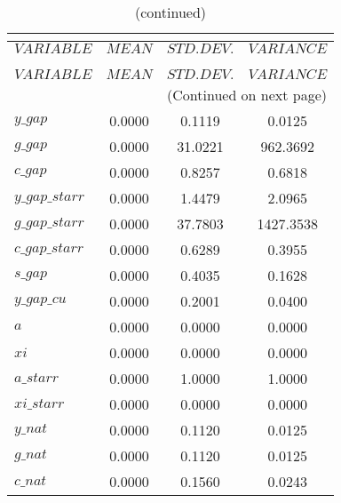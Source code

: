  
\begin{center}
\begin{longtable}{lccc} 
\caption{THEORETICAL MOMENTS}\\
 \label{Table:th_moments}\\
\toprule 
$VARIABLE       $	 & 	 $         MEAN$	 & 	 $    STD. DEV.$	 & 	 $     VARIANCE$\\
\midrule \endfirsthead 
\caption{(continued)}\\
 \toprule \\ 
$VARIABLE       $	 & 	 $         MEAN$	 & 	 $    STD. DEV.$	 & 	 $     VARIANCE$\\
\midrule \endhead 
\midrule \multicolumn{4}{r}{(Continued on next page)} \\ \bottomrule \endfoot 
\bottomrule \endlastfoot 
$y\_gap         $	 & 	       0.0000	 & 	       0.1119	 & 	       0.0125 \\ 
$g\_gap         $	 & 	       0.0000	 & 	      31.0221	 & 	     962.3692 \\ 
$c\_gap         $	 & 	       0.0000	 & 	       0.8257	 & 	       0.6818 \\ 
$y\_gap\_starr  $	 & 	       0.0000	 & 	       1.4479	 & 	       2.0965 \\ 
$g\_gap\_starr  $	 & 	       0.0000	 & 	      37.7803	 & 	    1427.3538 \\ 
$c\_gap\_starr  $	 & 	       0.0000	 & 	       0.6289	 & 	       0.3955 \\ 
$s\_gap         $	 & 	       0.0000	 & 	       0.4035	 & 	       0.1628 \\ 
$y\_gap\_cu     $	 & 	       0.0000	 & 	       0.2001	 & 	       0.0400 \\ 
$a              $	 & 	       0.0000	 & 	       0.0000	 & 	       0.0000 \\ 
$xi             $	 & 	       0.0000	 & 	       0.0000	 & 	       0.0000 \\ 
$a\_starr       $	 & 	       0.0000	 & 	       1.0000	 & 	       1.0000 \\ 
$xi\_starr      $	 & 	       0.0000	 & 	       0.0000	 & 	       0.0000 \\ 
$y\_nat         $	 & 	       0.0000	 & 	       0.1120	 & 	       0.0125 \\ 
$g\_nat         $	 & 	       0.0000	 & 	       0.1120	 & 	       0.0125 \\ 
$c\_nat         $	 & 	       0.0000	 & 	       0.1560	 & 	       0.0243 \\ 

\end{longtable}
\end{center}
